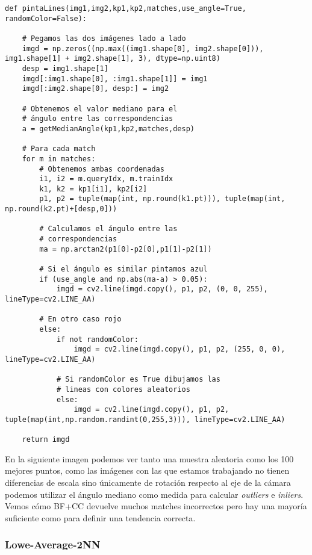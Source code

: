 \documentclass{article}
\newcommand{\img}[2]{
\noindent\makebox[\textwidth][c]{\texttt{[image: \#1]}}%
}
\begin{document}
\begin{lstlisting}
def pintaLines(img1,img2,kp1,kp2,matches,use_angle=True, randomColor=False):

    # Pegamos las dos imágenes lado a lado    
    imgd = np.zeros((np.max((img1.shape[0], img2.shape[0])), img1.shape[1] + img2.shape[1], 3), dtype=np.uint8)
    desp = img1.shape[1]
    imgd[:img1.shape[0], :img1.shape[1]] = img1
    imgd[:img2.shape[0], desp:] = img2

	# Obtenemos el valor mediano para el 
	# ángulo entre las correspondencias
    a = getMedianAngle(kp1,kp2,matches,desp)
    
    # Para cada match
    for m in matches:
        # Obtenemos ambas coordenadas
        i1, i2 = m.queryIdx, m.trainIdx
        k1, k2 = kp1[i1], kp2[i2]
        p1, p2 = tuple(map(int, np.round(k1.pt))), tuple(map(int, np.round(k2.pt)+[desp,0]))
		
        # Calculamos el ángulo entre las
        # correspondencias
        ma = np.arctan2(p1[0]-p2[0],p1[1]-p2[1])
        
        # Si el ángulo es similar pintamos azul
        if (use_angle and np.abs(ma-a) > 0.05):
            imgd = cv2.line(imgd.copy(), p1, p2, (0, 0, 255), lineType=cv2.LINE_AA)
            
        # En otro caso rojo
        else:
            if not randomColor:
                imgd = cv2.line(imgd.copy(), p1, p2, (255, 0, 0), lineType=cv2.LINE_AA)
            
            # Si randomColor es True dibujamos las 
            # lineas con colores aleatorios
            else:
                imgd = cv2.line(imgd.copy(), p1, p2, tuple(map(int,np.random.randint(0,255,3))), lineType=cv2.LINE_AA)

    return imgd
\end{lstlisting}

En la siguiente imagen podemos ver tanto una muestra aleatoria como los 100 mejores puntos, como las imágenes con las que estamos trabajando no tienen diferencias de escala sino únicamente de rotación respecto al eje de la cámara podemos utilizar el ángulo mediano como medida para calcular \textit{outliers} e \textit{inliers}. Vemos cómo BF+CC devuelve muchos matches incorrectos pero hay una mayoría suficiente como para definir una tendencia correcta.

\img{img/cc_rb}{0.9}

\subsubsection{Lowe-Average-2NN}
\end{document}
